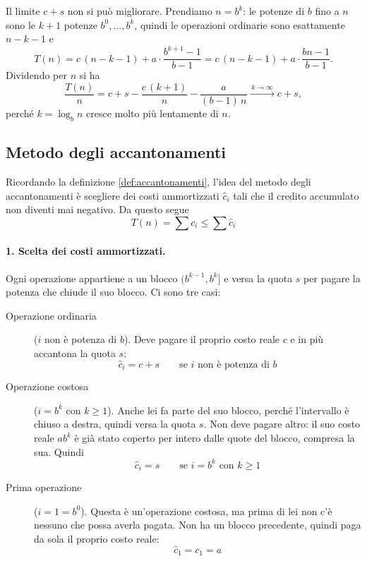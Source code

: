 \begin{osservazione}
    Il limite $c+s$ non si può migliorare. Prendiamo $n = b^k$: le potenze di $b$ fino a $n$ sono le $k+1$ potenze $b^0, \dots, b^k$, quindi le operazioni ordinarie sono esattamente $n-k-1$ e
    \[
    T(n) = c\,(n-k-1) + a \cdot \frac{b^{k+1}-1}{b-1} = c\,(n-k-1) + a \cdot \frac{bn-1}{b-1}.
    \]
    Dividendo per $n$ si ha
    \[
    \frac{T(n)}{n} = c + s - \frac{c\,(k+1)}{n} - \frac{a}{(b-1)\,n} \xrightarrow{\ k \to \infty\ } c + s,
    \]
    perché $k = \log_b n$ cresce molto più lentamente di $n$.
\end{osservazione}

\subsection{Metodo degli accantonamenti}\label{sec:appendice_esercizi_analisi_ammortizzata_accantonamento}
Ricordando la definizione \ref{def:accantonamenti}, l'idea del metodo degli accantonamenti è scegliere dei costi ammortizzati $\hat{c}_i$ tali che il credito accumulato non diventi mai negativo. Da questo segue
\[
T(n) = \sum c_i \le \sum \hat{c}_i
\]

\paragraph{1. Scelta dei costi ammortizzati.}
Ogni operazione appartiene a un blocco $(b^{k-1}, b^k]$ e versa la quota $s$ per pagare la potenza che chiude il suo blocco. Ci sono tre casi:
\begin{description}
    \item[Operazione ordinaria] ($i$ non è potenza di $b$). Deve pagare il proprio costo reale $c$ e in più accantona la quota $s$:
    \[
    \hat{c}_i = c + s \qquad \text{se } i \text{ non è potenza di } b
    \]
    \item[Operazione costosa] ($i=b^k$ con $k \ge 1$). Anche lei fa parte del suo blocco, perché l'intervallo è chiuso a destra, quindi versa la quota $s$. Non deve pagare altro: il suo costo reale $ab^k$ è già stato coperto per intero dalle quote del blocco, compresa la sua. Quindi
    \[
    \hat{c}_i = s \qquad \text{se } i = b^k \text{ con } k \ge 1
    \]
    \item[Prima operazione] ($i=1=b^0$). Questa è un'operazione costosa, ma prima di lei non c'è nessuno che possa averla pagata. Non ha un blocco precedente, quindi paga da sola il proprio costo reale:
    \[
    \hat{c}_1 = c_1 = a
    \]
\end{description}

